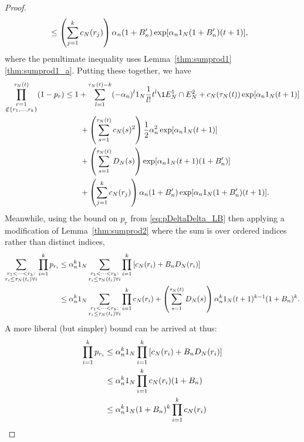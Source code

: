 \begin{proof}
\begin{align*}
&\leq \left( \sum_{j=1}^k c_N(r_j) \right)
        \alpha_n (1 + B_n^\prime) 
        \exp[ \alpha_n 1_N (1 + B_n^\prime) (t+1) ] ,
\end{align*}
where the penultimate inequality uses Lemma~\ref{thm:sumprod1}\ref{thm:sumprod1_a}.
Putting these together, we have
\begin{align}
\prod_{\substack{r=1 \\ \notin \{r_1,\dots,r_k\} }}^{\tau_N(t)} (1-p_r)
&\leq 1+ \sum_{l=1}^{\tau_N(t) -k} (-\alpha_n)^l \ON \frac{1}{l!} t^l
        \1{E_N^1 \cap E_N^2}
        + c_N(\tau_N(t)) \exp[ \alpha_n \ON (t+1) ] \notag\\
    &\qquad+ \left( \sum_{s=1}^{\tau_N(t)} c_N(s)^2 \right)
        \frac{1}{2} \alpha_n^2 \exp[ \alpha_n \ON (t+1) ] \notag\\
    &\qquad+ \left( \sum_{s=1}^{\tau_N(t)} D_N(s) \right)
        \exp[ \alpha_n \ON (t+1) (1+B_n^\prime) ] \notag\\
    &\qquad+ \left( \sum_{j=1}^k c_N(r_j) \right)
        \alpha_n (1 + B_n^\prime)
        \exp[ \alpha_n \ON (1 + B_n^\prime) (t+1) ] . \label{eq:034b}
\end{align}
Meanwhile, using the bound on $p_r$ from \eqref{eq:pDeltaDelta_LB} then applying a modification of Lemma~\ref{thm:sumprod2} where the sum is over ordered indices rather than distinct indices,
\begin{align}
\sum_{\substack{r_1 <\dots< r_k :\\ r_i \leq \tau_N(t_i) \forall i}}
        \prod_{i=1}^k p_{r_i}
&\leq \alpha_n^k 1_N 
        \sum_{\substack{r_1 <\dots< r_k :\\ r_i \leq \tau_N(t_i) \forall i}}
        \prod_{i=1}^k \left[ c_N(r_i) + B_n D_N(r_i) \right] \notag\\
&\leq \alpha_n^k 1_N
        \sum_{\substack{r_1 <\dots< r_k :\\ r_i \leq \tau_N(t_i) \forall i}}
        \prod_{i=1}^k c_N(r_i)
        + \left( \sum_{s=1}^{\tau_N(t)} D_N(s) \right)
        \alpha_n^k 1_N (t+1)^{k-1} (1+B_n)^k . \label{eq:035}
\end{align}
A more liberal (but simpler) bound can be arrived at thus:
\begin{align}
\prod_{i=1}^k p_{r_i}
&\leq \alpha_n^k \ON 
        \prod_{i=1}^k \left[ c_N(r_i) + B_n D_N(r_i) \right] \notag\\
&\leq \alpha_n^k \ON 
        \prod_{i=1}^k c_N(r_i) (1 + B_n) \notag\\
&\leq \alpha_n^k \ON (1 + B_n)^k
        \prod_{i=1}^k c_N(r_i) \label{eq:036}

\end{align}
\end{proof}
